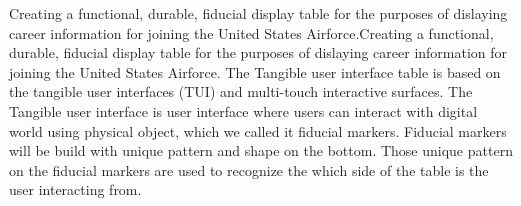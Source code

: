 Creating a functional, durable, fiducial display table for the purposes of dislaying career information for joining the United States Airforce.Creating a functional, durable, fiducial display table for the purposes of dislaying career information for joining the United States Airforce. The Tangible user interface table is based on the tangible user interfaces (TUI) and multi-touch interactive surfaces. The Tangible user interface is user interface where users can interact with digital world using physical object, which we called it fiducial markers. Fiducial markers will be build with unique pattern and shape on the bottom. Those unique pattern on the fiducial markers are used to recognize the which side of the table is the user interacting from. 
